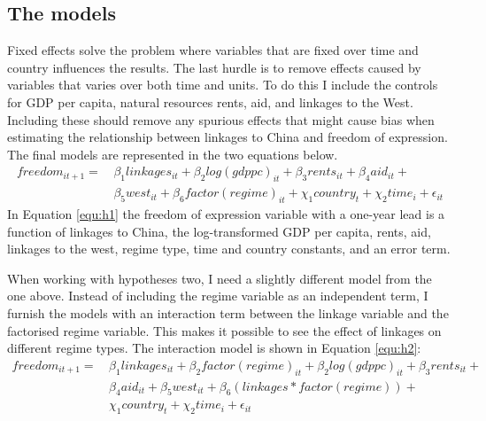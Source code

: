 \subsection{The models}
Fixed effects solve the problem where variables that are fixed over time and country influences the results. The last hurdle is to remove effects caused by variables that varies over both time and units. To do this I include the controls for GDP per capita, natural resources rents, aid, and linkages to the West. Including these should remove any spurious effects that might cause bias when estimating the relationship between linkages to China and freedom of expression. The final models are represented in the two equations below.
\begin{align} \label{equ:h1}
    freedom_{it+1} =\, & \beta_1  linkages_{it} + \beta_2 log(gdppc)_{it} + \beta_3 rents_{it} + \beta_4aid_{it} + \nonumber\\
    & \beta_5 west_{it} + \beta_6  factor(regime)_{it} + \chi_1 country_t + \chi_2 time_i + \epsilon_{it}
\end{align}
In Equation \ref{equ:h1} the freedom of expression variable with a one-year lead is a function of  linkages to China, the log-transformed GDP per capita, rents, aid, linkages to the west, regime type, time and country constants, and an error term.

When working with hypotheses two, I need a slightly different model from the one above. Instead of including the regime variable as an independent term, I furnish the models with an interaction term between the linkage variable and the factorised regime variable. This makes it possible to see the effect of linkages on different regime types. The interaction model is shown in Equation \ref{equ:h2}:
\begin{align} \label{equ:h2}
    freedom_{it+1} =\, & \beta_1 linkages_{it} + \beta_2 factor(regime)_{it} + \beta_2 log(gdppc)_{it} + \beta_3 rents_{it} + \nonumber\\
    & \beta_4 aid_{it} + \beta_5 west_{it} + \beta_6 (linkages * factor(regime)) + \nonumber\\
    & \chi_1 country_t +\chi_2 time_i + \epsilon_{it}
\end{align}